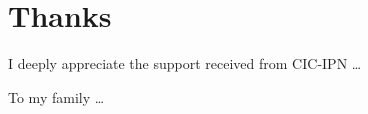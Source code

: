 % 
\section*{Thanks}
{\noindent
\textsf{I deeply appreciate the support received from CIC-IPN \ldots%
}} 
\begin{center}
\textsf{To my family \ldots}
\end{center}
\pagebreak
